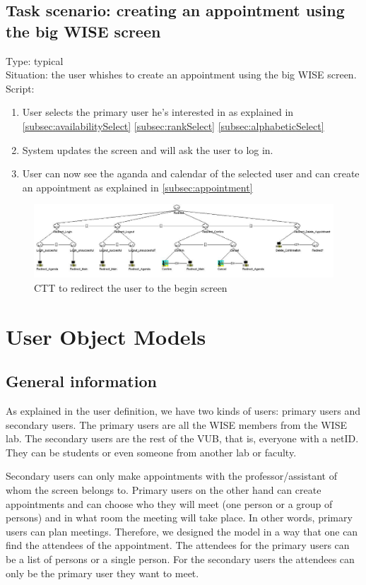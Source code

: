 \documentclass[11pt, a4paper,svglistings]{report}
\begin{document}
\subsection{Task scenario: creating an appointment using the big WISE screen}


Type: typical \\
Situation: the user whishes to create an appointment using the big WISE screen. \\
Script:
\begin{enumerate}
\item User selects the primary user he's interested in as explained in \ref{subsec:availabilitySelect} \ref{subsec:rankSelect} \ref{subsec:alphabeticSelect}
\item System updates the screen and will ask the user to log in.
\item User can now see the aganda and calendar of the selected user and can create an appointment as explained in \ref{subsec:appointment}
\end{enumerate}

\begin{figure}[H]
\centering
    \includegraphics[width=1\textwidth]{Redirect.jpg}
  \caption[Redirect CTT]{\label{fig:CreateAppointment}CTT to redirect the user to the begin screen}
\end{figure}


\section{User Object Models}

\subsection{General information}

As explained in the user definition, we have two kinds of users: primary users and secondary users. The primary users are all the WISE members from the WISE lab. The secondary users are the rest of the VUB, that is, everyone with a netID. They can be students or even someone from another lab or faculty.

Secondary users can only make appointments with the professor/assistant of whom the screen belongs to. Primary users on the other hand can create appointments and can choose who they will meet (one person or a group of persons) and in what room the meeting will take place. In other words, primary users can plan meetings. 
Therefore, we designed the model in a way that one can find the attendees of the appointment. The attendees for the primary users can be a list of persons or a single person. For the secondary users the attendees can only be the primary user they want to meet.
\end{document}

